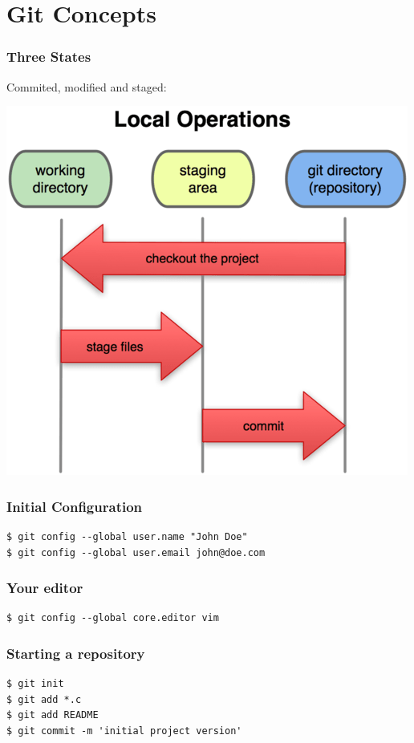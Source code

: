 \documentclass{beamer}
\begin{document}
\section{Git Concepts}

\frame{\insertsection}

\begin{frame}
\frametitle{Three States}
Commited, modified and staged:
\begin{center}
  \includegraphics[width=\textwidth,height=0.6\textheight,keepaspectratio]{imgs/states.png}
\end{center}
\end{frame}

\begin{frame}[fragile]
\frametitle{Initial Configuration}
\begin{lstlisting}
$ git config --global user.name "John Doe"
$ git config --global user.email john@doe.com
\end{lstlisting}
\end{frame}

\begin{frame}[fragile]
\frametitle{Your editor}
\begin{lstlisting}
$ git config --global core.editor vim
\end{lstlisting}
\end{frame}

\begin{frame}[fragile]
\frametitle{Starting a repository}
\begin{lstlisting}
$ git init
$ git add *.c
$ git add README
$ git commit -m 'initial project version'
\end{lstlisting}
\end{frame}
\end{document}
